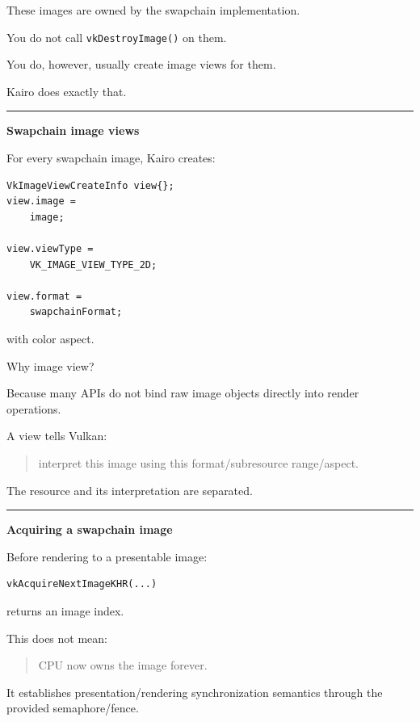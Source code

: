 These images are owned by the swapchain implementation.

You do not call \texttt{vkDestroyImage()} on them.

You do, however, usually create image views for them.

Kairo does exactly that.

\begin{center}\rule{0.5\linewidth}{0.5pt}\end{center}

\textbf{Swapchain image views}

For every swapchain image, Kairo creates:

\begin{verbatim}
VkImageViewCreateInfo view{};
view.image =
    image;

view.viewType =
    VK_IMAGE_VIEW_TYPE_2D;

view.format =
    swapchainFormat;
\end{verbatim}

with color aspect.

Why image view?

Because many APIs do not bind raw image objects directly into render operations.

A view tells Vulkan:

\begin{quote}
interpret this image using this format/subresource range/aspect.
\end{quote}

The resource and its interpretation are separated.

\begin{center}\rule{0.5\linewidth}{0.5pt}\end{center}

\textbf{Acquiring a swapchain image}

Before rendering to a presentable image:

\begin{verbatim}
vkAcquireNextImageKHR(...)
\end{verbatim}

returns an image index.

This does not mean:

\begin{quote}
CPU now owns the image forever.
\end{quote}

It establishes presentation/rendering synchronization semantics through the provided semaphore/fence.

